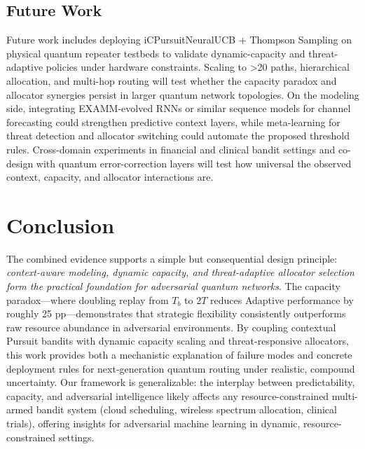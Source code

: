 \documentclass[10pt,twocolumn,journal]{IEEEtran}
\begin{document}
\subsection{Future Work}

Future work includes deploying iCPursuitNeuralUCB + Thompson Sampling on physical quantum repeater testbeds to validate dynamic-capacity and threat-adaptive policies under hardware constraints. Scaling to >20 paths, hierarchical allocation, and multi-hop routing will test whether the capacity paradox and allocator synergies persist in larger quantum network topologies. On the modeling side, integrating EXAMM-evolved RNNs or similar sequence models for channel forecasting could strengthen predictive context layers, while meta-learning for threat detection and allocator switching could automate the proposed threshold rules. Cross-domain experiments in financial and clinical bandit settings and co-design with quantum error-correction layers will test how universal the observed context, capacity, and allocator interactions are.

\section{Conclusion}
\label{sec:conclusion}

The combined evidence supports a simple but consequential design principle: \emph{context-aware modeling, dynamic capacity, and threat-adaptive allocator selection form the practical foundation for adversarial quantum networks}. The capacity paradox—where doubling replay from $T_b$ to $2T$ reduces Adaptive performance by roughly 25 pp—demonstrates that strategic flexibility consistently outperforms raw resource abundance in adversarial environments. By coupling contextual Pursuit bandits with dynamic capacity scaling and threat-responsive allocators, this work provides both a mechanistic explanation of failure modes and concrete deployment rules for next-generation quantum routing under realistic, compound uncertainty. Our framework is generalizable: the interplay between predictability, capacity, and adversarial intelligence likely affects any resource-constrained multi-armed bandit system (cloud scheduling, wireless spectrum allocation, clinical trials), offering insights for adversarial machine learning in dynamic, resource-constrained settings.
\end{document}
